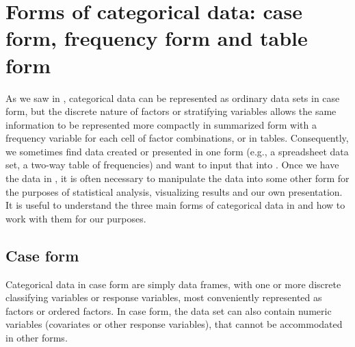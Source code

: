 \documentclass[11pt]{book}\usepackage[]{graphicx}\usepackage[]{color}
\makeatletter
\newcommand{\hlstr}[1]{\textcolor[rgb]{0.192,0.494,0.8}{#1}}%
\newcommand{\hlopt}[1]{\textcolor[rgb]{0,0,0}{#1}}%
\newcommand{\hlstd}[1]{\textcolor[rgb]{0.345,0.345,0.345}{#1}}%
\newcommand{\hlkwb}[1]{\textcolor[rgb]{0.69,0.353,0.396}{#1}}%
\newcommand{\hlkwc}[1]{\textcolor[rgb]{0.333,0.667,0.333}{#1}}%
\newcommand{\hlkwd}[1]{\textcolor[rgb]{0.737,0.353,0.396}{\textbf{#1}}}%
\newenvironment{kframe}{%
 \def\at@end@of@kframe{}%
 \ifinner\ifhmode%
  \def\at@end@of@kframe{\end{minipage}}%
  \begin{minipage}{\columnwidth}%
 \fi\fi%
 \def\FrameCommand##1{\hskip\@totalleftmargin \hskip-\fboxsep
 \colorbox{shadecolor}{##1}\hskip-\fboxsep
     \hskip-\linewidth \hskip-\@totalleftmargin \hskip\columnwidth}%
 \MakeFramed {\advance\hsize-\width
   \@totalleftmargin\z@ \linewidth\hsize
   \@setminipage}}%
 {\par\unskip\endMakeFramed%
 \at@end@of@kframe}
\newenvironment{knitrout}{}{} %
\renewenvironment{knitrout}{\small\renewcommand{\baselinestretch}{.85}}{} %
\makeatother
\begin{document}

\section{Forms of categorical data: case form, frequency form and table form}\label{sec:forms}
As we saw in , categorical data can be represented as ordinary data sets
in case form, but the discrete nature of factors or stratifying variables allows the same
information to be represented more compactly in summarized form with a frequency
variable for each cell of factor combinations, or in tables.  
Consequently, we sometimes 
find data created or presented in one form (e.g., a spreadsheet data set, a two-way
table of frequencies) and want to input that into \R.  Once we have the data in \R,
it is often necessary to manipulate the data into some other form for the purposes
of statistical analysis, visualizing results and our own presentation.
It is useful to understand the three main forms of categorical data in \R and how
to work with them for our purposes.

\subsection{Case form}
Categorical data in case form are simply data frames, with one or more discrete
classifying variables or response variables, most conveniently represented as factors or ordered factors.  In case form, the data set can also contain numeric variables
(covariates or other response variables), that cannot be accommodated in other
forms.
\end{document}
